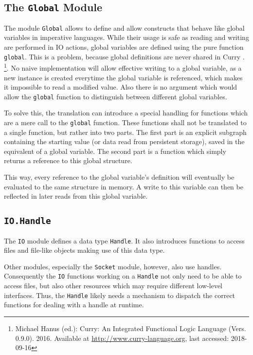 \subsection{The \texttt{Global} Module}

The module \texttt{Global} allows to define and allow constructs that behave like global variables in imperative languages.
While their usage is safe as reading and writing are performed in IO actions, global variables are defined using the pure function \texttt{global}.
This is a problem, because global definitions are never shared in Curry
\ifdefined\isthesis
\cite{curryreport}.
\else
\footnote{Michael Hanus (ed.): Curry: An Integrated Functional Logic Language (Vers. 0.9.0). 2016. Available at \url{http://www.curry-language.org}, last accessed: 2018-09-16}.
\fi
No naive implementation will allow effective writing to a global variable, as a new instance is created everytime the global variable is referenced, which makes it impossible to read a modified value.
Also there is no argument which would allow the \texttt{global} function to distinguish between different global variables.

To solve this, the translation can introduce a special handling for functions which are a mere call to the \texttt{global} function.
These functions shall not be translated to a single function, but rather into two parts.
The first part is an explicit subgraph containing the starting value (or data read from persistent storage), saved in the equivalent of a global variable.
The second part is a function which simply returns a reference to this global structure.

This way, every reference to the global variable's definition will eventually be evaluated to the same structure in memory.
A write to this variable can then be reflected in later reads from this global variable.

\subsection{\texttt{IO.Handle}}

The \texttt{IO} module defines a data type \texttt{Handle}.
It also introduces functions to access files and file-like objects making use of this data type.

Other modules, especially the \texttt{Socket} module, however, also use handles.
Consequently the \texttt{IO} functions working on a \texttt{Handle} not only need to be able to access files, but also other resources which may require different low-level interfaces.
Thus, the \texttt{Handle} likely needs a mechanism to dispatch the correct functions for dealing with a handle at runtime.

